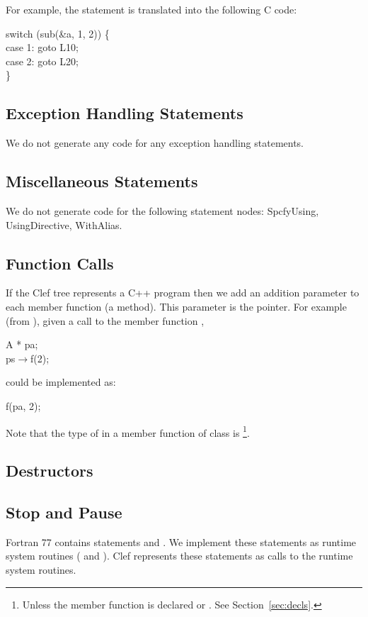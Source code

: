 For example, the statement  is
translated into the following C code:
\begin{codeseq}
\>switch (sub(\&a, 1, 2)) \{ \\
\>\>case 1: goto L10; \\
\>\>case 2: goto L20; \\
\>\}
\end{codeseq}

\subsection{Exception Handling Statements}

We do not generate any code for any exception handling
statements.

\subsection{Miscellaneous Statements}

We do not generate code for the following statement nodes:
SpcfyUsing, UsingDirective, WithAlias.

\subsection{Function Calls}

If the Clef tree represents a C++ program then we add an addition
parameter to each member function (\ie a method).  This parameter is
the  pointer.  For example (from \cite{ellis:90}),
given a call to the member function ,
\begin{codeseq}
A * pa; \\
ps$\rightarrow$f(2); \\
\end{codeseq}
could be implemented as:
\begin{codeseq}
f(pa, 2);
\end{codeseq}

Note that the type of  in a member function of class
 is \footnote{Unless the member function
is declared  or .  See Section~\ref{sec:decls}.}.

\subsection{Destructors}


\subsection{Stop and Pause}

Fortran 77 contains statements  and .  
We implement these statements as runtime system routines
( and ).  Clef
represents these statements as calls to the runtime system
routines.

